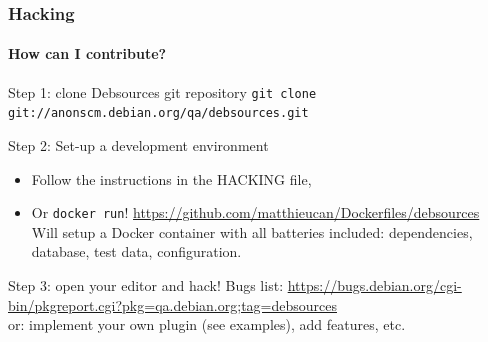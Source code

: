 \documentclass{beamer}
\begin{document}
\begin{frame}
  \frametitle{Hacking}
  \framesubtitle{How can I contribute?}
  \begin{block}{Step 1: clone Debsources git repository}
    \texttt{git clone git://anonscm.debian.org/qa/debsources.git}
  \end{block}
  \pause
  \begin{block}{Step 2: Set-up a development environment}
    \begin{itemize}
    \item Follow the instructions in the \alert{HACKING} file,
    \item Or \texttt{docker run}!
      \url{https://github.com/matthieucan/Dockerfiles/debsources}\\ Will
      setup a \alert{Docker container} with all batteries included:
      dependencies, database, test data, configuration.
    \end{itemize}
  \end{block}
  \pause
  \begin{block}{Step 3: open your editor and hack!}
    \alert{Bugs list}:
    \url{https://bugs.debian.org/cgi-bin/pkgreport.cgi?pkg=qa.debian.org;tag=debsources}
    \\
    or: implement your own \alert{plugin} (see examples), add \alert{features}, etc.
  \end{block}
\end{frame}

\background

\begin{frame}[plain]
\end{frame}
\end{document}
